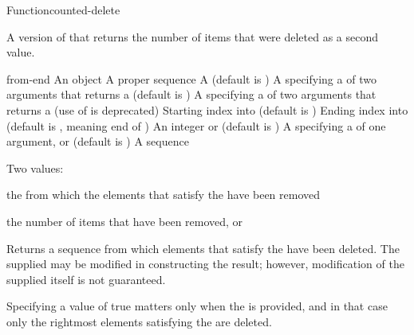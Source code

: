 \documentclass[10pt,twoside,english,pdftex]{article}
\begin{document}
\begin{functiondoc}{Function}{counted-delete}{
    }

\fnsyntax

\fnpurpose A version of  that returns the number of items
that were deleted as a second value. 

\fnpackage {}

\fnmodule {}

\fnargs
\begin{args}{from-end}
\arg[item] An object
\arg[sequence] A proper sequence
 A  (default is \nil) \arg[test] A
 specifying a  of two
arguments that returns a  (default is
)
 A  specifying a
 of two arguments that returns a
 (use of  is deprecated)
\arg[start] Starting index into  (default is )
\arg[end] Ending index into  (default is \nil, meaning
end of )
\arg[count] An integer or \nil{} (default is \nil)
\arg[key] A  specifying a 
of one argument, or \nil{} (default is \nil)
 A sequence
\end{args}

\fnreturns Two values: 
\begin{tightitemize}
\item the  from which the elements that satisfy the
   have been removed 
\item the number of items that have been removed, or \nil
\end{tightitemize}

\fndescription Returns a sequence from which elements that satisfy the
 have been deleted.  The supplied  may be
modified in constructing the result; however, modification of the supplied
 itself is not guaranteed.

Specifying a  value of true matters only when
the  is provided, and in that case only the rightmost
 elements satisfying the  are deleted.


\end{functiondoc}
\end{document}
